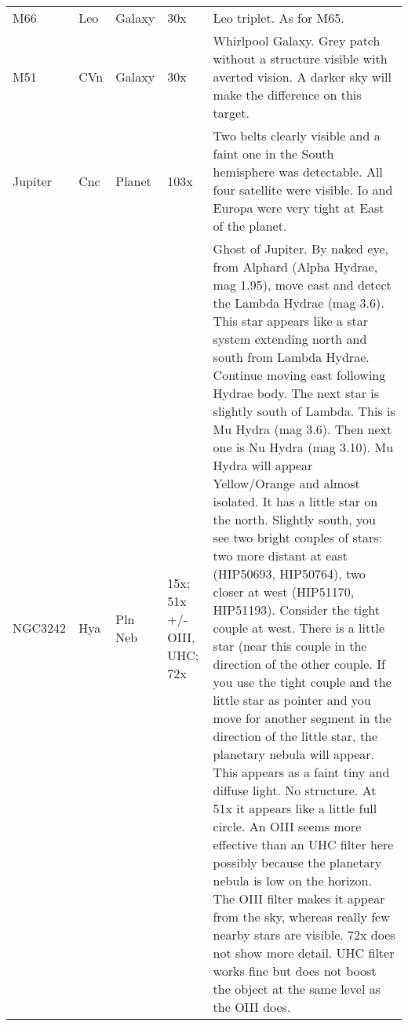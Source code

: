 \begin{longtable}{ p{0.7in}  p{0.3in}  p{0.6in}  p{0.9in}  p{5.8in} }
M66 & Leo & Galaxy & 30x & Leo triplet. As for M65.  \\ 
M51 & CVn & Galaxy & 30x & Whirlpool Galaxy. Grey patch without a structure visible with averted vision. A darker sky will make the difference on this target. \\ 
Jupiter & Cnc & Planet & 103x & Two belts clearly visible and a faint one in the South hemisphere was detectable. All four satellite were visible. Io and Europa were very tight at East of the planet. \\ 
NGC3242 & Hya & Pln Neb & 15x; 51x +/- OIII, UHC; 72x & Ghost of Jupiter. By naked eye, from Alphard (Alpha Hydrae, mag 1.95), move east and detect the Lambda Hydrae (mag 3.6). This star appears like a star system extending north and south from Lambda Hydrae. Continue moving east following Hydrae body. The next star is slightly south of Lambda. This is Mu Hydra (mag 3.6). Then next one is Nu Hydra (mag 3.10). Mu Hydra will appear Yellow/Orange and almost isolated. It has a little star on the north. Slightly south, you see two bright couples of stars: two more distant at east (HIP50693, HIP50764), two closer at west (HIP51170, HIP51193). Consider the tight couple at west. There is a little star (near this couple in the direction of the other couple. If you use the tight couple and the little star as pointer and you move for another segment in the direction of the little star, the planetary nebula will appear. This appears as a faint tiny and diffuse light. No structure. At 51x it appears like a little full circle. An OIII seems more effective than an UHC filter here possibly because the planetary nebula is low on the horizon. The OIII filter makes it appear from the sky, whereas really few nearby stars are visible. 72x does not show more detail. UHC filter works fine but does not boost the object at the same level as the OIII does. \\ 
\hline 
\end{longtable} 
